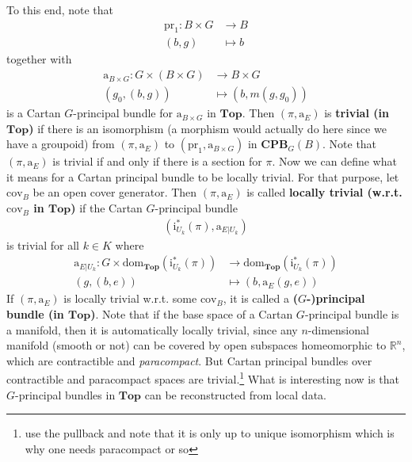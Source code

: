 \begin{exa}[Bundles 2]
To this end, note that
\begin{align*}
  \mathrm{pr}_{1}
  \colon
  B
  \times
  G
  &\rightarrow
  B
  \\
  (b,g)
  &\mapsto
  b
\end{align*}
together with
\begin{align*}
  \mathrm{a}_{B \times G}
  \colon
  G
  \times
  \left(
    B
    \times
    G
  \right)
  &\rightarrow
  B
  \times
  G
  \\
  (g_{0},(b,g))
  &\mapsto
  (b,m(g,g_{0}))
\end{align*}
is a Cartan $G$-principal bundle for $\mathrm{a}_{B \times G}$ in $\mathbf{Top}$.
Then $(\pi,\mathrm{a}_{E})$ is \textbf{trivial (in $\mathbf{Top}$)} if there is an isomorphism (a morphism would actually do here since we have a groupoid) from $(\pi,\mathrm{a}_{E})$ to $(\mathrm{pr}_{1},\mathrm{a}_{B \times G})$ in $\mathbf{CPB}_{G}(B)$.
Note that $(\pi,\mathrm{a}_{E})$ is trivial if and only if there is a section for $\pi$.
Now we can define what it means for a Cartan principal bundle to be locally trivial.
For that purpose, let $\mathrm{cov}_{B}$ be an open cover generator.
Then $(\pi,\mathrm{a}_{E})$ is called \textbf{locally trivial (w.r.t. $\mathrm{cov}_{B}$ in $\mathbf{Top}$)} if the Cartan $G$-principal bundle
\begin{align*}
  \left(
    \mathrm{i}_{U_{k}}^{\ast}(\pi),
    \mathrm{a}_{E \vert U_{k}}
  \right)
\end{align*}
is trivial for all $k \in K$ where
\begin{align*}
  \mathrm{a}_{E \vert U_{k}}
  \colon
  G
  \times
  \mathrm{dom}_{\mathbf{Top}}
  \left(
    \mathrm{i}_{U_{k}}^{\ast}(\pi)
  \right)
  &\rightarrow
  \mathrm{dom}_{\mathbf{Top}}
  \left(
    \mathrm{i}_{U_{k}}^{\ast}(\pi)
  \right)
  \\
  (g,(b,e))
  &\mapsto
  (b,\mathrm{a}_{E}(g,e))
\end{align*}
If $(\pi,\mathrm{a}_{E})$ is locally trivial w.r.t. some $\mathrm{cov}_{B}$, it is called a \textbf{($G$-)principal bundle (in $\mathbf{Top}$)}.
Note that if the base space of a Cartan $G$-principal bundle is a manifold, then it is automatically locally trivial, since any $n$-dimensional manifold (smooth or not) can be covered by open subspaces homeomorphic to $\mathbb{R}^{n}$, which are contractible and \textit{paracompact}.
But Cartan principal bundles over contractible and paracompact spaces are trivial.\footnote{use the pullback and note that it is only up to unique isomorphism which is why one needs paracompact or so} What is interesting now is that $G$-principal bundles in $\mathbf{Top}$ can be reconstructed from local data.

\end{exa}

